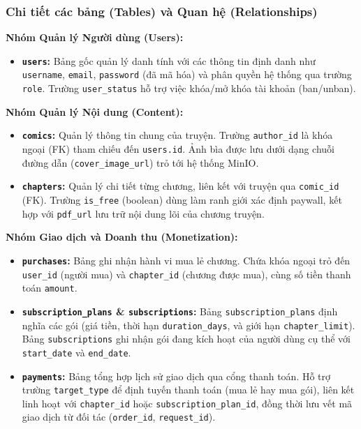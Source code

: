 \subsubsection{Chi tiết các bảng (Tables) và Quan hệ (Relationships)}

\textbf{Nhóm Quản lý Người dùng (Users):}
\begin{itemize}
    \item \textbf{\texttt{users}:} Bảng gốc quản lý danh tính với các thông tin định danh như \texttt{username}, \texttt{email}, \texttt{password} (đã mã hóa) và phân quyền hệ thống qua trường \texttt{role}. Trường \texttt{user\_status} hỗ trợ việc khóa/mở khóa tài khoản (ban/unban).
\end{itemize}

\textbf{Nhóm Quản lý Nội dung (Content):}
\begin{itemize}
    \item \textbf{\texttt{comics}:} Quản lý thông tin chung của truyện. Trường \texttt{author\_id} là khóa ngoại (FK) tham chiếu đến \texttt{users.id}. Ảnh bìa được lưu dưới dạng chuỗi đường dẫn (\texttt{cover\_image\_url}) trỏ tới hệ thống MinIO.
    \item \textbf{\texttt{chapters}:} Quản lý chi tiết từng chương, liên kết với truyện qua \texttt{comic\_id} (FK). Trường \texttt{is\_free} (boolean) dùng làm ranh giới xác định paywall, kết hợp với \texttt{pdf\_url} lưu trữ nội dung lõi của chương truyện.
\end{itemize}

\textbf{Nhóm Giao dịch và Doanh thu (Monetization):}
\begin{itemize}
    \item \textbf{\texttt{purchases}:} Bảng ghi nhận hành vi mua lẻ chương. Chứa khóa ngoại trỏ đến \texttt{user\_id} (người mua) và \texttt{chapter\_id} (chương được mua), cùng số tiền thanh toán \texttt{amount}.
    \item \textbf{\texttt{subscription\_plans} \& \textbf{\texttt{subscriptions}}:} Bảng \texttt{subscription\_plans} định nghĩa các gói (giá tiền, thời hạn \texttt{duration\_days}, và giới hạn \texttt{chapter\_limit}). Bảng \texttt{subscriptions} ghi nhận gói đang kích hoạt của người dùng cụ thể với \texttt{start\_date} và \texttt{end\_date}.
    \item \textbf{\texttt{payments}:} Bảng tổng hợp lịch sử giao dịch qua cổng thanh toán. Hỗ trợ trường \texttt{target\_type} để định tuyến thanh toán (mua lẻ hay mua gói), liên kết linh hoạt với \texttt{chapter\_id} hoặc \texttt{subscription\_plan\_id}, đồng thời lưu vết mã giao dịch từ đối tác (\texttt{order\_id}, \texttt{request\_id}).
\end{itemize}

